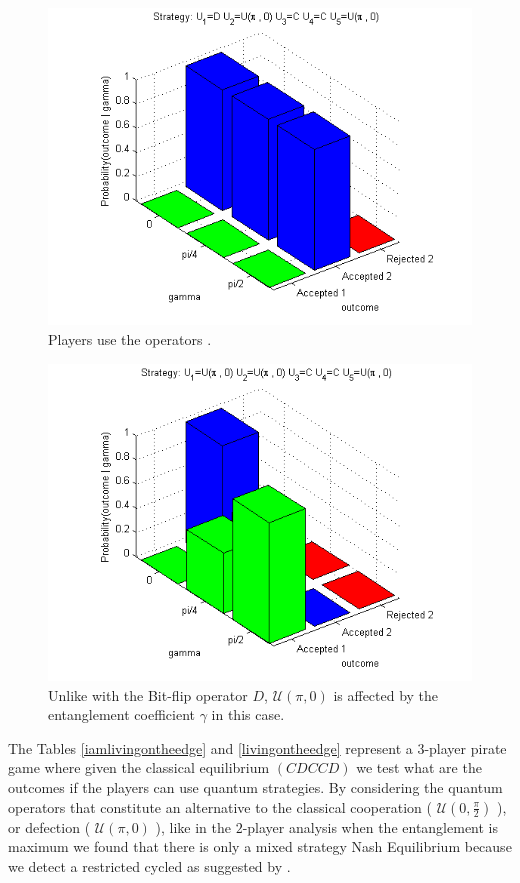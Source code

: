 \begin{figure}[!h]
\centering 
\includegraphics[scale=0.80]{Figures/1.5qubit/DUpi0CCUpi0.png}
\caption{Players use the operators . }
\label{fig:pg_3players_99_0_1:2}
\end{figure}

\begin{figure}[h!]
\centering 
\includegraphics[scale=0.80]{Figures/1.5qubit/Upi0Upi0CCUpi0.png}
\caption{Unlike with the Bit-flip operator $D$, $\mathcal{U} (\pi, 0)$ is affected by the entanglement coefficient $\gamma$ in this case. }
\label{fig:pg_3players_99_0_1:3}
\end{figure}


The Tables \ref{iamlivingontheedge} and \ref{livingontheedge} represent a $3$-player pirate game where given the classical equilibrium $(CDCCD)$ we test what are the outcomes if the players can use quantum strategies. By considering the quantum operators that constitute an alternative to the classical cooperation ( $\mathcal{U}( 0, \frac{\pi}{2})$ ), or defection ( $\mathcal{U}( \pi, 0)$ ), like in the $2$-player analysis when the entanglement is maximum we found that there is only a mixed strategy Nash Equilibrium because we detect a restricted cycled as suggested by \cite{Du}. 

